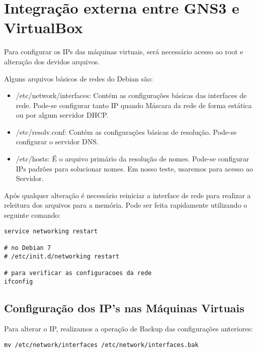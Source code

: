 \section{Integração externa entre GNS3 e VirtualBox}

Para configurar os IPs \cite{howtoforge} das máquinas virtuais, será necessário acesso ao root e alteração dos devidos arquivos.

Alguns arquivos básicos de redes do Debian são:

\begin{itemize}  

    \item /etc/network/interfaces: Contém as configurações básicas das interfaces de rede. Pode-se configurar tanto IP quando Máscara da rede de forma estática ou por algum servidor DHCP.
    
    \item /etc/resolv.conf: Contém as configurações básicas de resolução. Pode-se configurar o servidor DNS.
    
    \item /etc/hosts: É o arquivo primário da resolução de nomes. Pode-se configurar IPs padrões para solucionar nomes. Em nosso teste, usaremos para acesso ao Servidor.

\end{itemize}

Após qualquer alteração é necessário reiniciar a interface de rede para realizar a releitura dos arquivos para a memória. Pode ser feita rapidamente utilizando o seguinte comando:

\begin{lstlisting}
service networking restart

# no Debian 7
# /etc/init.d/networking restart

# para verificar as configuracoes da rede
ifconfig
\end{lstlisting}

\subsection{Configuração dos IP's nas Máquinas Virtuais}

Para alterar o IP, realizamos a operação de Backup das configurações anteriores:

\begin{lstlisting}
mv /etc/network/interfaces /etc/network/interfaces.bak
\end{lstlisting}

